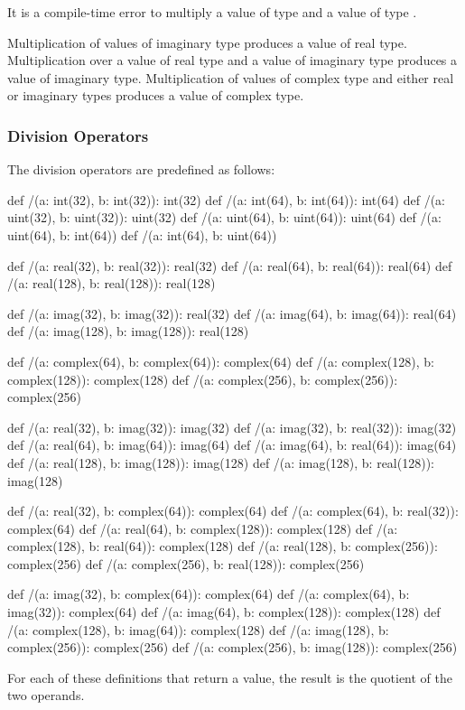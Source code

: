 It is a compile-time error to multiply a value of type  and
a value of type .

Multiplication of values of imaginary type produces a value of real
type.  Multiplication over a value of real type and a value of
imaginary type produces a value of imaginary type.  Multiplication of
values of complex type and either real or imaginary types produces a
value of complex type.

\subsubsection{Division Operators}
\label{Division_Operators}

The division operators are predefined as follows:
\begin{chapel}
def /(a: int(32), b: int(32)): int(32)
def /(a: int(64), b: int(64)): int(64)
def /(a: uint(32), b: uint(32)): uint(32)
def /(a: uint(64), b: uint(64)): uint(64)
def /(a: uint(64), b: int(64))
def /(a: int(64), b: uint(64))

def /(a: real(32), b: real(32)): real(32)
def /(a: real(64), b: real(64)): real(64)
def /(a: real(128), b: real(128)): real(128)

def /(a: imag(32), b: imag(32)): real(32)
def /(a: imag(64), b: imag(64)): real(64)
def /(a: imag(128), b: imag(128)): real(128)

def /(a: complex(64), b: complex(64)): complex(64)
def /(a: complex(128), b: complex(128)): complex(128)
def /(a: complex(256), b: complex(256)): complex(256)

def /(a: real(32), b: imag(32)): imag(32)
def /(a: imag(32), b: real(32)): imag(32)
def /(a: real(64), b: imag(64)): imag(64)
def /(a: imag(64), b: real(64)): imag(64)
def /(a: real(128), b: imag(128)): imag(128)
def /(a: imag(128), b: real(128)): imag(128)

def /(a: real(32), b: complex(64)): complex(64)
def /(a: complex(64), b: real(32)): complex(64)
def /(a: real(64), b: complex(128)): complex(128)
def /(a: complex(128), b: real(64)): complex(128)
def /(a: real(128), b: complex(256)): complex(256)
def /(a: complex(256), b: real(128)): complex(256)

def /(a: imag(32), b: complex(64)): complex(64)
def /(a: complex(64), b: imag(32)): complex(64)
def /(a: imag(64), b: complex(128)): complex(128)
def /(a: complex(128), b: imag(64)): complex(128)
def /(a: imag(128), b: complex(256)): complex(256)
def /(a: complex(256), b: imag(128)): complex(256)
\end{chapel}
For each of these definitions that return a value, the result is the
quotient of the two operands.

